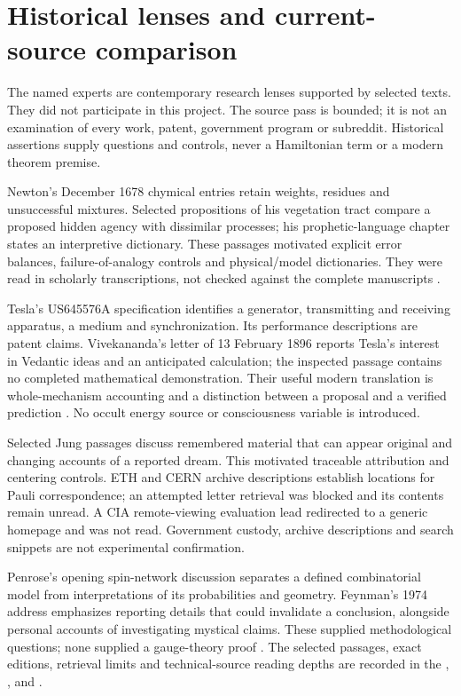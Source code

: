 \section{Historical lenses and current-source comparison}

The named experts are contemporary research lenses supported by selected texts.
They did not participate in this project. The source pass is bounded; it is not
an examination of every work, patent, government program or subreddit.
Historical assertions supply questions and controls, never a Hamiltonian term
or a modern theorem premise.

Newton's December 1678 chymical entries retain weights, residues and unsuccessful
mixtures. Selected propositions of his vegetation tract compare a proposed
hidden agency with dissimilar processes; his prophetic-language chapter states
an interpretive dictionary. These passages motivated explicit error balances,
failure-of-analogy controls and physical/model dictionaries. They were read in
scholarly transcriptions, not checked against the complete manuscripts
\cite{newtonlab,newtonveg,newtonprophecy}.

Tesla's US645576A specification identifies a generator, transmitting and receiving
apparatus, a medium and synchronization. Its performance descriptions are patent
claims. Vivekananda's letter of 13 February 1896 reports Tesla's interest in
Vedantic ideas and an anticipated calculation; the inspected passage contains no
completed mathematical demonstration. Their useful modern translation is
whole-mechanism accounting and a distinction between a proposal and a verified
prediction \cite{tesla,vivekananda}. No occult energy source or consciousness
variable is introduced.

Selected Jung passages discuss remembered material that can appear original and
changing accounts of a reported dream. This motivated traceable attribution and
centering controls. ETH and CERN archive descriptions establish locations for
Pauli correspondence; an attempted letter retrieval was blocked and its contents
remain unread. A CIA remote-viewing evaluation lead redirected to a generic
homepage and was not read. Government custody, archive descriptions and search
snippets are not experimental confirmation.

Penrose's opening spin-network discussion separates a defined combinatorial
model from interpretations of its probabilities and geometry. Feynman's 1974
address emphasizes reporting details that could invalidate a conclusion,
alongside personal accounts of investigating mystical claims. These supplied
methodological questions; none supplied a gauge-theory proof
\cite{jung,penrose,feynman}. The selected
passages, exact editions, retrieval limits and technical-source reading depths
are recorded in the
,
, and
.

